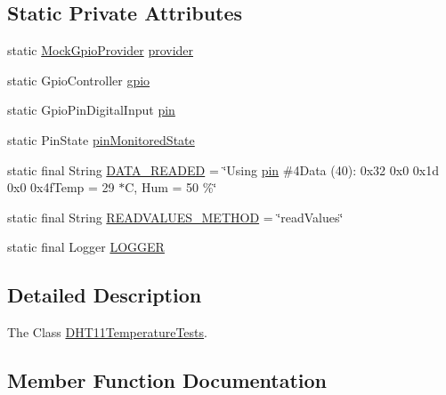 \subsection*{Static Private Attributes}
\begin{DoxyCompactItemize}
\item 
static \hyperlink{classcom_1_1libsensorj_1_1mock_1_1MockGpioProvider}{Mock\+Gpio\+Provider} \hyperlink{classcom_1_1libsensorj_1_1concretesensor_1_1test_1_1DHT11TemperatureTests_ada4cbdf40a6bcf6a09aff3cf8603f649}{provider}
\item 
static Gpio\+Controller \hyperlink{classcom_1_1libsensorj_1_1concretesensor_1_1test_1_1DHT11TemperatureTests_a7de266694c33835d976bfcd36c973ab6}{gpio}
\item 
static Gpio\+Pin\+Digital\+Input \hyperlink{classcom_1_1libsensorj_1_1concretesensor_1_1test_1_1DHT11TemperatureTests_a539cfe245f8a95e61ba9fbee05ae4f22}{pin}
\item 
static Pin\+State \hyperlink{classcom_1_1libsensorj_1_1concretesensor_1_1test_1_1DHT11TemperatureTests_a0b1e8ff10deeef685ecc52fe4254e239}{pin\+Monitored\+State}
\item 
static final String \hyperlink{classcom_1_1libsensorj_1_1concretesensor_1_1test_1_1DHT11TemperatureTests_a59d2eecae4aa5084dfdc56ec6ddad4c4}{D\+A\+T\+A\+\_\+\+R\+E\+A\+D\+E\+D} = \char`\"{}Using \hyperlink{classcom_1_1libsensorj_1_1concretesensor_1_1test_1_1DHT11TemperatureTests_a539cfe245f8a95e61ba9fbee05ae4f22}{pin} \#4\+Data (40)\+: 0x32 0x0 0x1d 0x0 0x4f\+Temp = 29 $\ast$\+C, Hum = 50 \%\char`\"{}
\item 
static final String \hyperlink{classcom_1_1libsensorj_1_1concretesensor_1_1test_1_1DHT11TemperatureTests_a2e6886cd64d8982ff792d10404bca66f}{R\+E\+A\+D\+V\+A\+L\+U\+E\+S\+\_\+\+M\+E\+T\+H\+O\+D} = \char`\"{}read\+Values\char`\"{}
\item 
static final Logger \hyperlink{classcom_1_1libsensorj_1_1concretesensor_1_1test_1_1DHT11TemperatureTests_a12743e84b5d8a4c300c1ef20c6f7eed4}{L\+O\+G\+G\+E\+R}
\end{DoxyCompactItemize}


\subsection{Detailed Description}
The Class \hyperlink{classcom_1_1libsensorj_1_1concretesensor_1_1test_1_1DHT11TemperatureTests}{D\+H\+T11\+Temperature\+Tests}. 

\subsection{Member Function Documentation}
\hypertarget{classcom_1_1libsensorj_1_1concretesensor_1_1test_1_1DHT11TemperatureTests_a1bc150d93e863d5d10ec0a16ae44779b}{}
